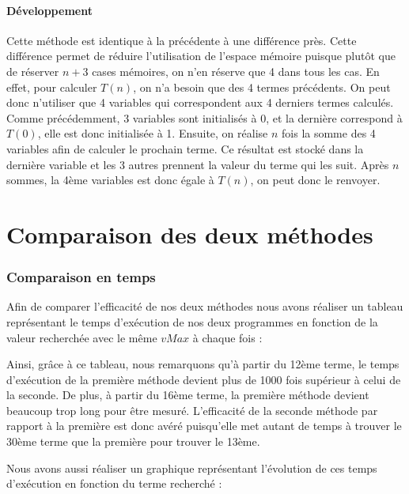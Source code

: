 \documentclass{article}
\begin{document}
\subsection{Développement}
Cette méthode est identique à la précédente à une différence près. Cette différence permet de réduire l'utilisation de l'espace mémoire puisque plutôt que de réserver $n+3$ cases mémoires, on n'en réserve que 4 dans tous les cas. En effet, pour calculer $T(n)$, on n'a besoin que des 4 termes précédents. On peut donc n'utiliser que 4 variables qui correspondent aux 4 derniers termes calculés. Comme précédemment, 3 variables sont initialisés à 0, et la dernière correspond à $T(0)$, elle est donc initialisée à 1. Ensuite, on réalise $n$ fois la somme des 4 variables afin de calculer le prochain terme. Ce résultat est stocké dans la dernière variable et les 3 autres prennent la valeur du terme qui les suit. Après $n$ sommes, la 4ème variables est donc égale à $T(n)$, on peut donc le renvoyer.
\newpage
\part{Comparaison des deux méthodes}
\section{Comparaison en temps}
Afin de comparer l'efficacité de nos deux méthodes nous avons réaliser un tableau représentant le temps d'exécution de nos deux programmes en fonction de la valeur recherchée avec le même $vMax$ à chaque fois :

\bigbreak
\begin{center}
\end{center}
\bigbreak

Ainsi, grâce à ce tableau, nous remarquons qu'à partir du 12ème terme, le temps d'exécution de la première méthode devient plus de 1000 fois supérieur à celui de la seconde. De plus, à partir du 16ème terme, la première méthode devient beaucoup trop long pour être mesuré. L'efficacité de la seconde méthode par rapport à la première est donc avéré puisqu'elle met autant de temps à trouver le 30ème terme que la première pour trouver le 13ème.

Nous avons aussi réaliser un graphique représentant l'évolution de ces temps d'exécution en fonction du terme recherché :

\bigbreak
\begin{center}
\end{center}
\bigbreak
\end{document}
